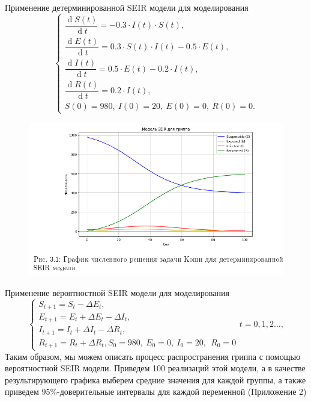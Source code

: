 \documentclass[notheorems]{beamer}
\renewcommand{\d}{\operatorname{d}}
\begin{document}
\begin{frame}
	{Применение детерминированной SEIR модели для моделирования}
	\begin{equation*}
		\begin{cases}
			\dfrac {\d S(t)}{\d t} = - 0.3 \cdot I(t)\cdot S(t),\\
			\dfrac {\d E(t)}{\d t} = 0.3 \cdot S(t)\cdot I(t) - 0.5\cdot E(t),\\
			\dfrac{\d I(t)}{\d t} =0.5 \cdot E(t) - 0.2\cdot I(t),\\
			\dfrac{\d R(t)}{\d t} = 0.2\cdot I(t),\\
			S(0) = 980,\ I(0) = 20,\ E(0) = 0,\ R(0) = 0.
		\end{cases}
	\end{equation*} 
	\begin{figure}
		\centering
		\includegraphics[scale=0.25]{"../../Курсовая работа MFVAR/slides/screenshot007"}
		\caption{}
		\label{fig:screenshot007}
	\end{figure}
	
\end{frame}

\begin{frame}
	{Применение вероятностной SEIR модели для моделирования}
	\begin{equation}
		\begin{cases}
			S_{t+1} = S_t - \Delta E_t,\\
			E_{t+1} = E_t +\Delta E_t - \Delta I_t,\\
			I_{t+1} = I_t + \Delta I_t - \Delta R_t,\\
			R_{t+1} = R_t + \Delta R_t,
			S_0 = 980,\ E_0 = 0,\ I_0 = 20,\ \ R_0 = 0
		\end{cases}
		t = 0,1,2\ldots,
	\end{equation}
	Таким образом, мы можем описать процесс распространения гриппа с помощью вероятностной SEIR модели. Приведем 100 реализаций этой модели, а в качестве результирующего графика выберем средние значения для каждой группы, а также приведем 95\%-доверительные интервалы для каждой переменной (Приложение 2)
\end{frame}
\end{document}
